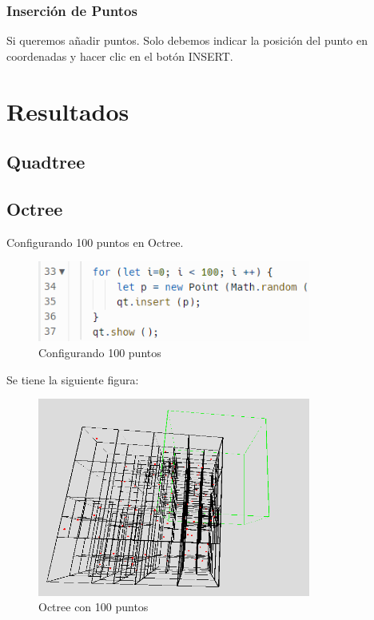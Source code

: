 \documentclass{article}
\begin{document}
\subsubsection{Inserción de Puntos}
Si queremos añadir puntos. Solo debemos indicar la posición del punto en coordenadas y hacer clic en el botón INSERT.


\section{Resultados}

\subsection{Quadtree}

\subsection{Octree}

Configurando 100 puntos en Octree.

\begin{figure}[H]
\centering
\includegraphics[width=0.8\textwidth]{img/oct_100.png}
\caption{Configurando 100 puntos}
\end{figure}

Se tiene la siguiente figura:

\begin{figure}[H]
\centering
\includegraphics[width=0.8\textwidth]{img/oct_100puntos.png}
\caption{Octree con 100 puntos}
\end{figure}
\end{document}

